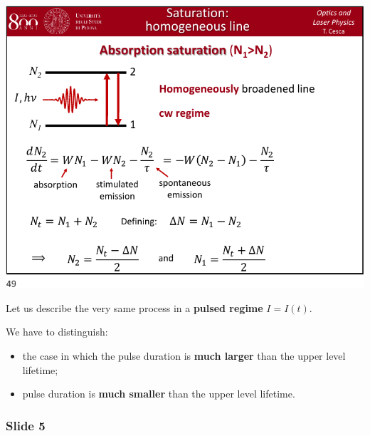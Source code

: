 \documentclass[../main/main.tex]{subfiles}
\begin{document}
\begin{minipage}[]{0.5\linewidth}
\centering
\includegraphics[page=4,width=1\textwidth]{../lessons/pdf_file/10_lecture.pdf}
\end{minipage}
\hspace{0.3cm}\vspace{0.3cm}
\begin{minipage}[c]{0.47\linewidth}

Let us describe the very same process in a \textbf{pulsed regime} \( I = I (t) \).

We have to distinguish:
\begin{itemize}
\item the case in which the pulse duration is \textbf{much larger} than the upper level lifetime;

\item pulse duration is \textbf{much smaller} than the upper level lifetime.
\end{itemize}


\end{minipage}

\subsubsection*{Slide 5}
\end{document}
